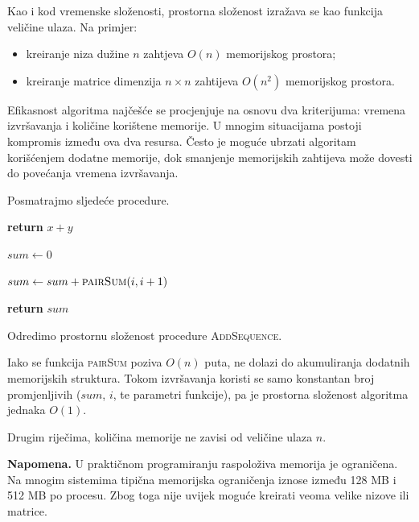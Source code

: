 Kao i kod vremenske složenosti, prostorna složenost izražava se kao funkcija veličine ulaza.  Na primjer:

\begin{itemize}
	\item kreiranje niza dužine $n$ zahtjeva $O(n)$ memorijskog prostora;
	\item kreiranje matrice dimenzija $n \times n$ zahtijeva $O(n^2)$ memorijskog prostora.
\end{itemize}

Efikasnost algoritma najčešće se procjenjuje na osnovu dva kriterijuma: vremena izvršavanja i količine korištene memorije. U mnogim situacijama postoji kompromis između ova dva resursa. Često je moguće ubrzati algoritam korišćenjem dodatne memorije, dok smanjenje memorijskih zahtijeva može dovesti do povećanja vremena izvršavanja.

\begin{example}
	Posmatrajmo sljedeće procedure.
	
	\begin{algorithm}[H]
		\begin{algorithmic}[1]
			\State \textbf{return} $x+y$
			\EndProcedure
		\end{algorithmic}
	\end{algorithm}
	
	\begin{algorithm}[H]
		\begin{algorithmic}[1]
			\State $sum \gets 0$
			
			\State $sum \gets sum + \textsc{pairSum}(i,i+1)$
			\EndFor
			
			\State \textbf{return} $sum$
			\EndProcedure
		\end{algorithmic}
	\end{algorithm}
	
	Odredimo prostornu složenost procedure \textsc{AddSequence}.
	
	Iako se funkcija \textsc{pairSum} poziva $O(n)$ puta, ne dolazi do akumuliranja dodatnih memorijskih struktura. Tokom izvršavanja koristi se samo konstantan broj promjenljivih ($sum$, $i$, te parametri funkcije), pa je prostorna složenost algoritma jednaka	$
	O(1).
	$
	
	Drugim riječima, količina memorije ne zavisi od veličine ulaza $n$.
\end{example}

\textbf{Napomena.} 
U praktičnom programiranju raspoloživa memorija je ograničena. Na mnogim sistemima tipična memorijska ograničenja iznose između 128 MB i 512 MB po procesu. Zbog toga nije uvijek moguće kreirati veoma velike nizove ili matrice.

